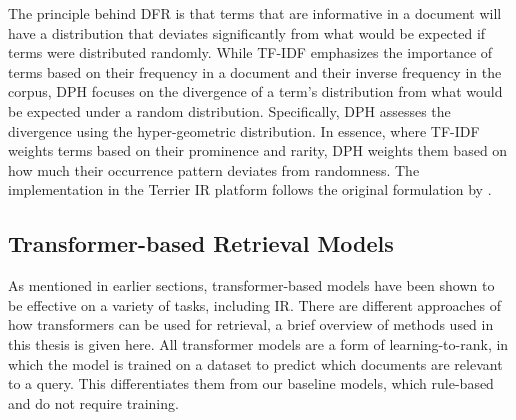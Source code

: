 The principle behind DFR is that terms that are informative in a document will have a distribution that deviates significantly from what would be expected if terms were distributed randomly.
While TF-IDF emphasizes the importance of terms based on their frequency in a document and their inverse frequency in the corpus, DPH focuses on the divergence of a term's distribution from what would be expected under a random distribution.
Specifically, DPH assesses the divergence using the hyper-geometric distribution.
In essence, where TF-IDF weights terms based on their prominence and rarity, DPH weights them based on how much their occurrence pattern deviates from randomness.
The implementation in the Terrier IR platform follows the original formulation by \cite{amati:2006:Frequentist}.


\subsection{Transformer-based Retrieval Models}\label{sec:transformer-retrieval-models}
As mentioned in earlier sections, transformer-based models have been shown to be effective on a variety of tasks, including IR.
There are different approaches of how transformers can be used for retrieval, a brief overview of methods used in this thesis is given here.
All transformer models are a form of learning-to-rank, in which the model is trained on a dataset to predict which documents are relevant to a query.
This differentiates them from our baseline models, which rule-based and do not require training.

